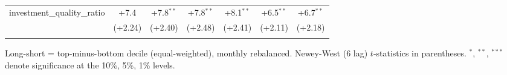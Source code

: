 \begin{table}[htbp]
\begin{threeparttable}
\begin{tabular}{lcccccc}
\addlinespace
investment\_quality\_ratio & +7.4 & +7.8$^{**}$ & +7.8$^{**}$ & +8.1$^{**}$ & +6.5$^{**}$ & +6.7$^{**}$ \\
 & (+2.24) & (+2.40) & (+2.48) & (+2.41) & (+2.11) & (+2.18) \\
\addlinespace
\bottomrule
\end{tabular}
\begin{tablenotes}\footnotesize
\item Long-short = top-minus-bottom decile (equal-weighted), monthly rebalanced. Newey-West (6 lag) $t$-statistics in parentheses. $^{*}$, $^{**}$, $^{***}$ denote significance at the 10\%, 5\%, 1\% levels.
\end{tablenotes}
\end{threeparttable}
\end{table}